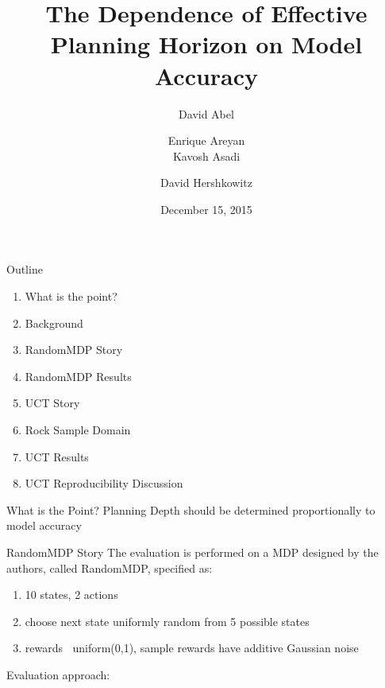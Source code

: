 \documentclass{beamer}
\title[The Dependence of Planning Horizon on Model Accuracy]{The Dependence of Effective Planning Horizon on Model Accuracy}
\author[]{David Abel  \and Enrique Areyan \\ Kavosh Asadi  \and David Hershkowitz}
\date{December 15, 2015}
\begin{document}
\begin{frame}
\titlepage
\end{frame}

\begin{frame}{Outline}
\begin{enumerate}
	\item What is the point?
	\item Background
	\item RandomMDP Story
	\item RandomMDP Results
	\item UCT Story
	\item Rock Sample Domain
	\item UCT Results
	\item UCT Reproducibility Discussion
\end{enumerate}
\end{frame}

\begin{frame}{What is the Point?}
\centering
Planning Depth should be determined proportionally to model accuracy
\end{frame}


\begin{frame}{RandomMDP Story}
The evaluation is performed on a MDP designed by the authors, called RandomMDP, specified as:
\begin{enumerate}
\item 10 states, 2 actions
\item choose next state uniformly random from 5 possible states
\item rewards $~$ uniform(0,1), sample rewards have additive Gaussian noise
\end{enumerate}
Evaluation approach:


\end{frame}
\end{document}
